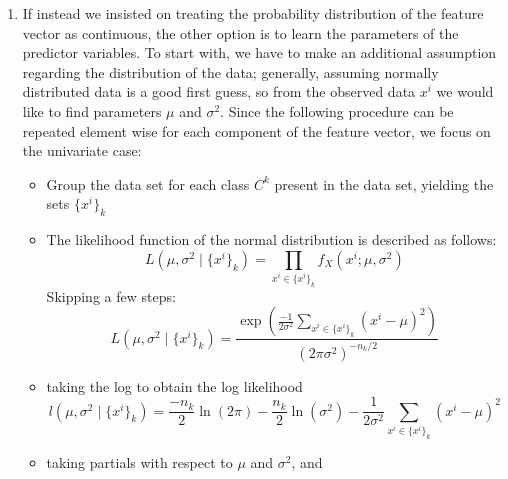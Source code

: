 \documentclass{article} %
\begin{document}
\begin{enumerate}
    We can get around this analytical issue by discretizing the predictor
    vector:
    \begin{itemize}
      \item First we would bin the observed values in whatever method is
        most representative of the predictor's nature (equal-width, quantile,
        etc.)
      \item Then we normalize the histograms by dividing the height of
        each column by $n$, we get back a discrete random variable
      \item Repeat this procedure element wise for each entry in the
        feature vector
      \item let $x_{ij}$ be the $j$th entry of the $i$th feature vector,
        we can calculate the likelihood as:
        \[
          p(x^i \vert C_k) = \prod p(x_{ij} \vert C_k)
        \]
    \end{itemize}
  \item If instead we insisted on treating the probability
    distribution of the feature vector as continuous, the other
    option is to learn the parameters of the predictor variables. To
    start with, we have to make an additional assumption regarding
    the distribution of the data; generally, assuming normally
    distributed data is a good first guess, so from the observed data
    $x^i$ we would like to find parameters $\mu$ and $\sigma^2$. Since
    the following procedure can be repeated element wise for each
    component of the feature vector, we focus on the univariate case:
    \begin{itemize}
      \item Group the data set for each class $C^k$ present in the
        data set, yielding the sets $\{x^i\}_k$
      \item The likelihood function of the normal distribution is
        described as follows:
        \[
          L(\mu, \sigma^2 \mid \{x^i\}_k) = \prod_{x^i \in \{x^i\}_k}
          f_X(x^i; \mu, \sigma^2)
        \]
        Skipping a few steps:
        \[
          L(\mu, \sigma^2 \mid \{x^i\}_k) =
          \frac{\exp\left(\frac{-1}{2\sigma^2}\sum_{x^i \in
          \{x^i\}_k}(x^i-\mu)^2\right)}{(2\pi\sigma^2)^{-n_k/2}}
        \]
      \item taking the log to obtain the log likelihood
        \[
          l(\mu, \sigma^2 \mid \{x^i\}_k) = \frac{-n_k}{2}\ln(2\pi) -
          \frac{n_k}{2}\ln(\sigma^2) - \frac{1}{2\sigma^2}\sum_{x^i
          \in \{x^i\}_k} (x^i-\mu)^2
        \]
      \item taking partials with respect to $\mu$ and $\sigma^2$, and

\end{itemize}
\end{enumerate}
\end{document}
